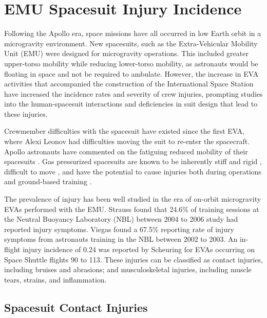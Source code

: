 \documentclass[defaultstyle,11pt]{comps}
\begin{document}
\hypertarget{emu-spacesuit-injury-incidence}{%
\section{EMU Spacesuit Injury Incidence}\label{emu-spacesuit-injury-incidence}}

Following the Apollo era, space missions have all occurred in low Earth orbit in a microgravity environment.
New spacesuits, such as the Extra-Vehicular Mobility Unit (EMU) were designed for microgravity operations.
This included greater upper-torso mobility while reducing lower-torso mobility, as astronauts would be floating in space and not be required to ambulate.
However, the increase in EVA activities that accompanied the construction of the International Space Station have increased the incidence rates and severity of crew injuries, prompting studies into the human-spacesuit interactions and deficiencies in suit design that lead to these injuries.

Crewmember difficulties with the spacesuit have existed since the first EVA, where Alexi Leonov had difficulties moving the suit to re-enter the spacecraft.
Apollo astronauts have commented on the fatiguing reduced mobility of their spacesuits \citep{Scheuring2008}.
Gas pressurized spacesuits are known to be inherently stiff and rigid \citep{Parry1966, Abramov1994, Schmidt2001a, Holschuh2009}, difficult to move \citep{Norcross2009, Amick2015}, and have the potential to cause injuries both during operations and ground-based training \citep{Williams2003, Strauss2004, Scheuring2008, Scheuring2009, Anderson2015a, Chappell2017}.

The prevalence of injury has been well studied in the era of on-orbit microgravity EVAs performed with the EMU.
Strauss \citep{Strauss2004} found that 24.6\% of training sessions at the Neutral Buoyancy Laboratory (NBL) between 2004 to 2006 study had reported injury symptoms.
Viegas \citep{Viegas2004} found a 67.5\% reporting rate of injury symptoms from astronauts training in the NBL between 2002 to 2003.
An in-flight injury incidence of 0.24 was reported by Scheuring \citep{Scheuring2012} for EVAs occurring on Space Shuttle flights 90 to 113.
These injuries can be classified as contact injuries, including bruises and abrasions; and musculoskeletal injuries, including muscle tears, strains, and inflammation.

\hypertarget{spacesuit-contact-injuries}{%
\subsection{Spacesuit Contact Injuries}\label{spacesuit-contact-injuries}}
\end{document}

